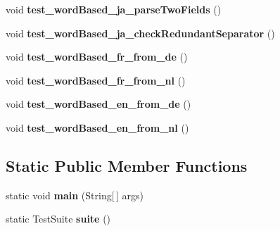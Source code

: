 \begin{DoxyCompactItemize}
\item 
\hypertarget{classorg_1_1joda_1_1time_1_1format_1_1_test_period_format_a5b5dc222cd5f0073694cc7f4d9fb406b}{void {\bfseries test\-\_\-word\-Based\-\_\-ja\-\_\-parse\-Two\-Fields} ()}\label{classorg_1_1joda_1_1time_1_1format_1_1_test_period_format_a5b5dc222cd5f0073694cc7f4d9fb406b}

\item 
\hypertarget{classorg_1_1joda_1_1time_1_1format_1_1_test_period_format_a694e9e806c961454540b1145527e8aea}{void {\bfseries test\-\_\-word\-Based\-\_\-ja\-\_\-check\-Redundant\-Separator} ()}\label{classorg_1_1joda_1_1time_1_1format_1_1_test_period_format_a694e9e806c961454540b1145527e8aea}

\item 
\hypertarget{classorg_1_1joda_1_1time_1_1format_1_1_test_period_format_a155f3b2e0315035f7f0d969969271f17}{void {\bfseries test\-\_\-word\-Based\-\_\-fr\-\_\-from\-\_\-de} ()}\label{classorg_1_1joda_1_1time_1_1format_1_1_test_period_format_a155f3b2e0315035f7f0d969969271f17}

\item 
\hypertarget{classorg_1_1joda_1_1time_1_1format_1_1_test_period_format_a6369e9176dfac7704cc5d02042147e4f}{void {\bfseries test\-\_\-word\-Based\-\_\-fr\-\_\-from\-\_\-nl} ()}\label{classorg_1_1joda_1_1time_1_1format_1_1_test_period_format_a6369e9176dfac7704cc5d02042147e4f}

\item 
\hypertarget{classorg_1_1joda_1_1time_1_1format_1_1_test_period_format_a6e86b62467ea7b6efd97d07013070cf6}{void {\bfseries test\-\_\-word\-Based\-\_\-en\-\_\-from\-\_\-de} ()}\label{classorg_1_1joda_1_1time_1_1format_1_1_test_period_format_a6e86b62467ea7b6efd97d07013070cf6}

\item 
\hypertarget{classorg_1_1joda_1_1time_1_1format_1_1_test_period_format_a6c78ea729d35681ca46ca2e540516e72}{void {\bfseries test\-\_\-word\-Based\-\_\-en\-\_\-from\-\_\-nl} ()}\label{classorg_1_1joda_1_1time_1_1format_1_1_test_period_format_a6c78ea729d35681ca46ca2e540516e72}

\end{DoxyCompactItemize}
\subsection*{Static Public Member Functions}
\begin{DoxyCompactItemize}
\item 
\hypertarget{classorg_1_1joda_1_1time_1_1format_1_1_test_period_format_af0479c9b6bc4b3abc327d5475412ff3c}{static void {\bfseries main} (String\mbox{[}$\,$\mbox{]} args)}\label{classorg_1_1joda_1_1time_1_1format_1_1_test_period_format_af0479c9b6bc4b3abc327d5475412ff3c}

\item 
\hypertarget{classorg_1_1joda_1_1time_1_1format_1_1_test_period_format_a1a14854596af8a491e0492c394016fca}{static Test\-Suite {\bfseries suite} ()}\label{classorg_1_1joda_1_1time_1_1format_1_1_test_period_format_a1a14854596af8a491e0492c394016fca}

\end{DoxyCompactItemize}
